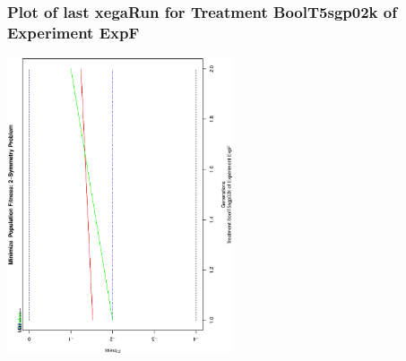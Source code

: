  \begin{frame}
 \frametitle{ Plot of last xegaRun for Treatment BoolT5sgp02k of Experiment ExpF }
 \begin{center}
\includegraphics[width=0.5\textwidth, angle=-90]
{ExpFPlotPopStatsFigure000.eps}
 \end{center}
 \label{report/ExpFPlotPopStatsFigure000.eps}  
 \end{frame}

